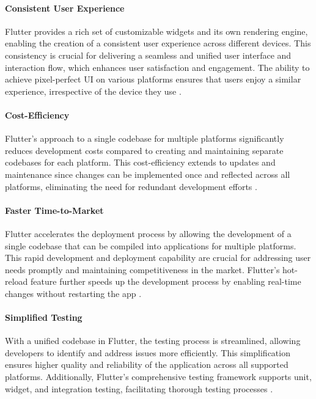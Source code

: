 \paragraph{Consistent User Experience} Flutter provides a rich set of customizable widgets and its own rendering engine, enabling the creation of a consistent user experience across different devices. This consistency is crucial for delivering a seamless and unified user interface and interaction flow, which enhances user satisfaction and engagement. The ability to achieve pixel-perfect UI on various platforms ensures that users enjoy a similar experience, irrespective of the device they use \cite{flutter_cons_pros}.

\paragraph{Cost-Efficiency} Flutter’s approach to a single codebase for multiple platforms significantly reduces development costs compared to creating and maintaining separate codebases for each platform. This cost-efficiency extends to updates and maintenance since changes can be implemented once and reflected across all platforms, eliminating the need for redundant development efforts \cite{codecademy_flutter}.

\paragraph{Faster Time-to-Market} Flutter accelerates the deployment process by allowing the development of a single codebase that can be compiled into applications for multiple platforms. This rapid development and deployment capability are crucial for addressing user needs promptly and maintaining competitiveness in the market. Flutter's hot-reload feature further speeds up the development process by enabling real-time changes without restarting the app \cite{flutter_hot_reload}.

\paragraph{Simplified Testing} With a unified codebase in Flutter, the testing process is streamlined, allowing developers to identify and address issues more efficiently. This simplification ensures higher quality and reliability of the application across all supported platforms. Additionally, Flutter’s comprehensive testing framework supports unit, widget, and integration testing, facilitating thorough testing processes \cite{flutter_testing}.



